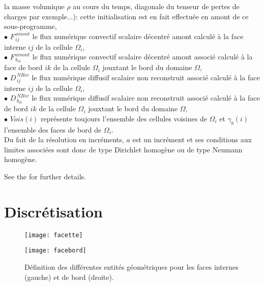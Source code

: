 la masse volumique $\rho$ au cours du temps, diagonale du tenseur de pertes de
charges par exemple...): cette initialisation est en fait effectu\'ee en amont
de ce sous-programme, \\
$\bullet$ $F^{\,amont}_{\,ij}$ le flux num\'erique convectif scalaire
d\'ecentr\'e amont calcul\'e \`a la face interne $ij$ de la cellule $\Omega_i$,\\
$\bullet$ $F^{\,amont}_{\,b_{ik}}$ le flux num\'erique convectif scalaire
d\'ecentr\'e amont associ\'e calcul\'e \`a la face de bord $ik$ de la cellule $\Omega_i$
jouxtant le bord du domaine $\Omega$,\\
$\bullet$ $D^{\,NRec}_{\,ij}$ le flux num\'erique diffusif scalaire non
reconstruit associ\'e calcul\'e \`a la face interne $ij$ de la cellule $\Omega_i$,\\
$\bullet$ $D^{\,NRec}_{\,{b}_{ik}}$ le flux num\'erique diffusif scalaire non
reconstruit associ\'e calcul\'e \`a la face de bord $ik$ de la cellule $\Omega_i$ jouxtant le bord du domaine $\Omega$,\\
$\bullet$ $Vois(i)$ repr\'esente toujours l'ensemble des cellules
voisines de ${\Omega_i}$ et $\gamma_b(i)$ l'ensemble des faces de
bord de ${\Omega_i}$.\\
Du fait de la r\'esolution en incr\'ements, $a$ est un incr\'ement et ses
conditions aux limites associ\'ees sont donc de type Dirichlet homog\`ene ou de
type
Neumann homog\`ene.

See the  for further details.

\section*{Discr\'etisation}

\begin{figure}[h]
\parbox{8cm}{%
\centerline{\texttt{[image: facette]}}}
\parbox{8cm}{%
\centerline{\texttt{[image: facebord]}}}
\caption{\label{Base_Matrix_fig_geom_gradmc}D\'efinition des diff\'erentes entit\'es
g\'eom\'etriques pour les faces internes (gauche) et de bord (droite).}
\end{figure}

